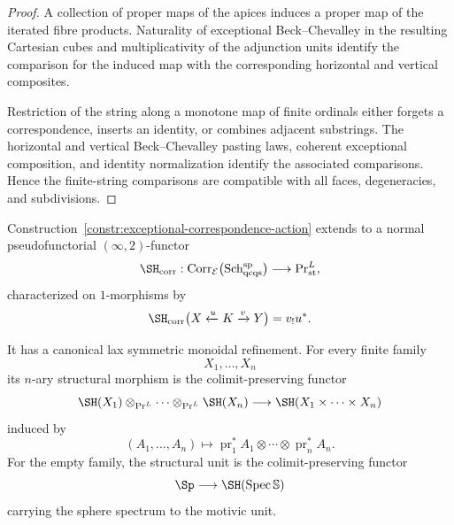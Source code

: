 \begin{proof}
A collection of proper maps of the apices induces a proper map of the
iterated fibre products.  Naturality of exceptional Beck--Chevalley in the
resulting Cartesian cubes and multiplicativity of the adjunction units
identify the comparison for the induced map with the corresponding
horizontal and vertical composites.

Restriction of the string along a monotone map of finite ordinals either
forgets a correspondence, inserts an identity, or combines adjacent
substrings.  The horizontal and vertical Beck--Chevalley pasting laws,
coherent exceptional composition, and identity normalization identify the
associated comparisons.  Hence the finite-string comparisons are
compatible with all faces, degeneracies, and subdivisions.
\end{proof}

\begin{theorem}
\label{thm:exceptional-correspondence-functor}
Construction~\ref{constr:exceptional-correspondence-action} extends to a
normal pseudofunctorial \((\infty,2)\)-functor
\[
    \SH_{\mathrm{corr}}:
    \operatorname{Corr}_{\mathcal E}
    \bigl(
      \operatorname{Sch}^{\mathrm{sp}}_{\mathrm{qcqs}}
    \bigr)
    \longrightarrow
    \operatorname{Pr}^L_{\mathrm{st}},
\]
characterized on \(1\)-morphisms by
\[
    \SH_{\mathrm{corr}}
    \bigl(
      X\xleftarrow{u}K\xrightarrow{v}Y
    \bigr)
    =
    v_!u^*.
\]

It has a canonical lax symmetric monoidal refinement.  For every finite
family
\[
    X_1,\ldots,X_n
\]
its \(n\)-ary structural morphism is the colimit-preserving functor
\[
    \SH(X_1)
    \otimes_{\operatorname{Pr}^L}
    \cdots
    \otimes_{\operatorname{Pr}^L}
    \SH(X_n)
    \longrightarrow
    \SH(X_1\times\cdots\times X_n)
\]
induced by
\[
    (A_1,\ldots,A_n)
    \longmapsto
    \operatorname{pr}_1^*A_1
    \otimes\cdots\otimes
    \operatorname{pr}_n^*A_n.
\]
For the empty family, the structural unit is the colimit-preserving functor
\[
    \Sp
    \longrightarrow
    \SH(\operatorname{Spec}\mathbb S)
\]
carrying the sphere spectrum to the motivic unit.
\end{theorem}

